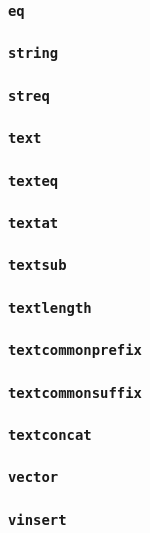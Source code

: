 \subsubsection{\texttt{eq}}

\subsubsection{\texttt{string}}
\subsubsection{\texttt{streq}}

\subsubsection{\texttt{text}}
\subsubsection{\texttt{texteq}}
\subsubsection{\texttt{textat}}
\subsubsection{\texttt{textsub}}
\subsubsection{\texttt{textlength}}
\subsubsection{\texttt{textcommonprefix}}
\subsubsection{\texttt{textcommonsuffix}}
\subsubsection{\texttt{textconcat}}

\subsubsection{\texttt{vector}}
\subsubsection{\texttt{vinsert}}
